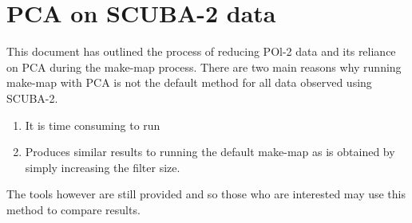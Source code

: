 \chapter{PCA on SCUBA-2 data}
\label{app:pca}

This document has outlined the process of reducing POl-2 data and its
reliance on PCA during the make-map process. There are two main reasons 
why running make-map with PCA is not the default method for all data observed
using SCUBA-2. 

\begin{enumerate}
\item It is time consuming to run
\item Produces similar results to running the default make-map as 
is obtained by simply increasing the filter size.
\end{enumerate}

The tools however are still provided and so those who are interested
may use this method to compare results.
